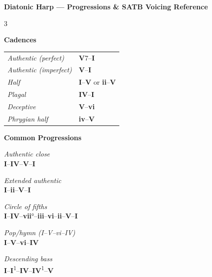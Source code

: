 \documentclass[letterpaper]{article}
\newcommand{\inv}[1]{\textsuperscript{#1}}
\newcommand{\rn}[2]{\textbf{#1}#2}
\begin{document}
\pagestyle{empty}

\begin{center}
{\large\bfseries Diatonic Harp --- Progressions \& SATB Voicing Reference}
\end{center}

\vspace{2mm}

\begin{multicols}{3}

{\small\colorbox{headerbg}{\color{white}\textbf{\quad Cadences\quad}}}

\vspace{2mm}
{\small
\begin{tabular}{@{}ll@{}}
\textit{Authentic (perfect)} & \rn{V}{7}--\rn{I}{} \\[2pt]
\textit{Authentic (imperfect)} & \rn{V}{}--\rn{I}{} \\[2pt]
\textit{Half} & \rn{I}{}--\rn{V}{} or \rn{ii}{}--\rn{V}{} \\[2pt]
\textit{Plagal} & \rn{IV}{}--\rn{I}{} \\[2pt]
\textit{Deceptive} & \rn{V}{}--\rn{vi}{} \\[2pt]
\textit{Phrygian half} & \rn{iv}{}--\rn{V}{} \\
\end{tabular}
}

\vspace{4mm}
{\small\colorbox{headerbg}{\color{white}\textbf{\quad Common Progressions\quad}}}

\vspace{2mm}
{\small
\textit{Authentic close}\\
\rn{I}{}--\rn{IV}{}--\rn{V}{}--\rn{I}{}

\vspace{2mm}
\textit{Extended authentic}\\
\rn{I}{}--\rn{ii}{}--\rn{V}{}--\rn{I}{}

\vspace{2mm}
\textit{Circle of fifths}\\
\rn{I}{}--\rn{IV}{}--\rn{vii}{°}--\rn{iii}{}--\rn{vi}{}--\rn{ii}{}--\rn{V}{}--\rn{I}{}

\vspace{2mm}
\textit{Pop/hymn (I--V--vi--IV)}\\
\rn{I}{}--\rn{V}{}--\rn{vi}{}--\rn{IV}{}

\vspace{2mm}
\textit{Descending bass}\\
\rn{I}{}--\rn{I}{}\inv{1}--\rn{IV}{}--\rn{IV}{}\inv{1}--\rn{V}{}

}
\end{multicols}
\end{document}

